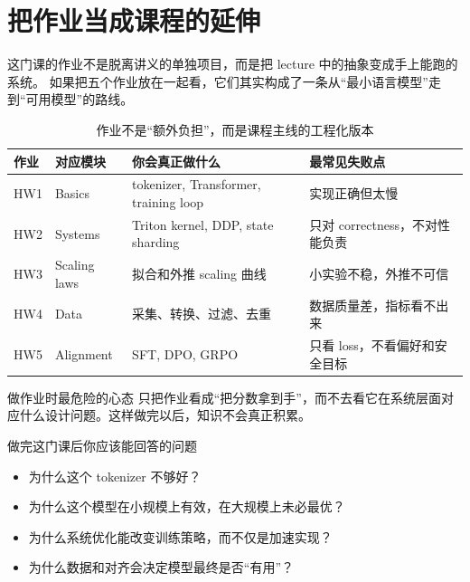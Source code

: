 \section{把作业当成课程的延伸}

这门课的作业不是脱离讲义的单独项目，而是把 lecture 中的抽象变成手上能跑的系统。
如果把五个作业放在一起看，它们其实构成了一条从“最小语言模型”走到“可用模型”的路线。

\begin{table}[H]
\centering
\begin{tabular}{p{2.1cm}p{3.1cm}p{4.3cm}p{3.5cm}}
\toprule
\textbf{作业} & \textbf{对应模块} & \textbf{你会真正做什么} & \textbf{最常见失败点} \\
\midrule
HW1 & Basics & tokenizer, Transformer, training loop & 实现正确但太慢 \\
HW2 & Systems & Triton kernel, DDP, state sharding & 只对 correctness，不对性能负责 \\
HW3 & Scaling laws & 拟合和外推 scaling 曲线 & 小实验不稳，外推不可信 \\
HW4 & Data & 采集、转换、过滤、去重 & 数据质量差，指标看不出来 \\
HW5 & Alignment & SFT, DPO, GRPO & 只看 loss，不看偏好和安全目标 \\
\bottomrule
\end{tabular}
\caption{作业不是“额外负担”，而是课程主线的工程化版本}
\end{table}

\begin{warningbox}{做作业时最危险的心态}
只把作业看成“把分数拿到手”，而不去看它在系统层面对应什么设计问题。这样做完以后，知识不会真正积累。
\end{warningbox}

\begin{knowledgebox}{做完这门课后你应该能回答的问题}
\begin{itemize}
    \item 为什么这个 tokenizer 不够好？
    \item 为什么这个模型在小规模上有效，在大规模上未必最优？
    \item 为什么系统优化能改变训练策略，而不仅是加速实现？
    \item 为什么数据和对齐会决定模型最终是否“有用”？
\end{itemize}
\end{knowledgebox}

